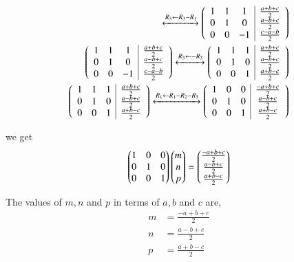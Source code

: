 \documentclass[journal,12pt,twocolumn]{IEEEtran}
\theoremstyle{remark}
\begin{document}
\begin{align}
{\begin{array}{ccc|c}
\end{array}
}
\xleftrightarrow[]{R_3 \leftarrow R_3-R_1}
\begin{pmatrix}\begin{array}{ccc|c}
1&1&1&\frac{a+b+c}{2}\\0&1&0&\frac{a-b+c}{2}\\0&0&-1&\frac{c-a-b}{2}
\end{array}
\end{pmatrix}\\
\begin{pmatrix}\begin{array}{ccc|c}
1&1&1&\frac{a+b+c}{2}\\0&1&0&\frac{a-b+c}{2}\\0&0&-1&\frac{c-a-b}{2}
\end{array}
\end{pmatrix}
\xleftrightarrow[]{R_3 \leftarrow -R_3}
\begin{pmatrix}\begin{array}{ccc|c}
1&1&1&\frac{a+b+c}{2}\\0&1&0&\frac{a-b+c}{2}\\0&0&1&\frac{a+b-c}{2}
\end{array}
\end{pmatrix}\\
\begin{pmatrix}\begin{array}{ccc|c}
1&1&1&\frac{a+b+c}{2}\\0&1&0&\frac{a-b+c}{2}\\0&0&1&\frac{a+b-c}{2}
\end{array}
\end{pmatrix}
\xleftrightarrow[]{R_1 \leftarrow R_1-R_2-R_3}
\begin{pmatrix}\begin{array}{ccc|c}
1&0&0&\frac{-a+b+c}{2}\\0&1&0&\frac{a-b+c}{2}\\0&0&1&\frac{a+b-c}{2}
\end{array}
\end{pmatrix}
\end{align}

\vspace{0.3cm}
we get
\begin{align}
\begin{pmatrix}1&0&0\\0&1&0\\0&0&1\end{pmatrix}\begin{pmatrix}m\\n\\p\end{pmatrix} = \begin{pmatrix}\frac{-a+b+c}{2}\\\frac{a-b+c}{2}\\\frac{a+b-c}{2}\end{pmatrix}
\end{align}

\vspace{0.3cm}
The values of $m,n$ and $p$ in terms of $a,b$ and $c$ are,
\begin{align}
m &= \frac{-a+b+c}{2}\\
n &= \frac{a-b+c}{2}\\
p &= \frac{a+b-c}{2}
\end{align}
\end{document}
